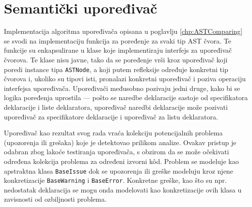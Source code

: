\section{Semantički upoređivač}
\label{sec:ImplementationComparer}

Implementacija algoritma upoređivača opisana u poglavlju \ref{chp:ASTComparing} se svodi na implementaciju funkcija za poređenje za svaki tip AST čvora. Te funkcije su enkapsulirane u klase koje implementiraju interfejs za upoređivač čvorova. Te klase nisu javne, tako da se poređenje vrši kroz upoređivač koji poredi instance tipa \texttt{ASTNode}, a koji putem refleksije određuje konkretni tip čvorova i, ukoliko su tipovi isti, pronalazi konkretni upoređivač i poziva operaciju interfejsa upoređivača. Upoređivači međusobno pozivaju jedni druge, kako bi se logika poređenja uprostila --- pošto se naredbe deklaracije sastoje od specifikatora deklaracije i liste deklaratora, upoređivač naredbi deklaracije može pozivati upoređivač za specifikatore deklaracije i upoređivač za listu deklaratora. 

Upoređivač kao rezultat svog rada vraća kolekciju potencijalnih problema (upozorenja ili grešaka) koje je detektovao prilikom analize. Ovakav pristup je odabran zbog lakoće testiranja upoređivača, s obzirom da se može očekivati određena kolekcija problema za određeni izvorni k\^od. Problem se modeluje kao apstraktna klasa \texttt{BaseIssue} dok se upozorenja ili greške modeluju kroz njene konkretizacije \texttt{BaseWarning} i \texttt{BaseError}. Konkretne greške, kao što su npr. nedostatak deklaracija se mogu onda modelovati kao konkretizacije ovih klasa u zavisnosti od ozbiljnosti problema. 